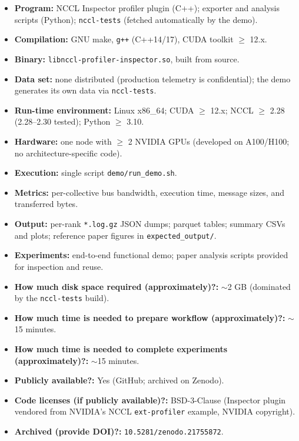 \documentclass[10pt,twocolumn]{article}
\begin{document}
{\small
\begin{itemize}
  \item {\bf Program: } NCCL Inspector profiler plugin (C++);
        exporter and analysis scripts (Python);
        \texttt{nccl-tests} (fetched automatically by the demo).
  \item {\bf Compilation: } GNU make, \texttt{g++} (C++14/17),
        CUDA toolkit $\geq$ 12.x.
  \item {\bf Binary: } \texttt{libnccl-profiler-inspector.so},
        built from source.
  \item {\bf Data set: } none distributed (production telemetry is
        confidential); the demo generates its own data via
        \texttt{nccl-tests}.
  \item {\bf Run-time environment: } Linux x86\_64; CUDA $\geq$ 12.x;
        NCCL $\geq$ 2.28 (2.28--2.30 tested); Python $\geq$ 3.10.
  \item {\bf Hardware: } one node with $\geq$ 2 NVIDIA GPUs
        (developed on A100/H100; no architecture-specific code).
  \item {\bf Execution: } single script \texttt{demo/run\_demo.sh}.
  \item {\bf Metrics: } per-collective bus bandwidth, execution
        time, message sizes, and transferred bytes.
  \item {\bf Output: } per-rank \texttt{*.log.gz} JSON dumps;
        parquet tables; summary CSVs and plots; reference paper
        figures in \texttt{expected\_output/}.
  \item {\bf Experiments: } end-to-end functional demo; paper
        analysis scripts provided for inspection and reuse.
  \item {\bf How much disk space required (approximately)?: }
        $\sim$2 GB (dominated by the \texttt{nccl-tests} build).
  \item {\bf How much time is needed to prepare workflow
        (approximately)?: } $\sim$15 minutes.
  \item {\bf How much time is needed to complete experiments
        (approximately)?: } $\sim$15 minutes.
  \item {\bf Publicly available?: } Yes (GitHub; archived on
        Zenodo).
  \item {\bf Code licenses (if publicly available)?: }
        BSD-3-Clause (Inspector plugin vendored from NVIDIA's NCCL
        \texttt{ext-profiler} example, NVIDIA copyright).
  \item {\bf Archived (provide DOI)?: }
        \texttt{10.5281/zenodo.21755872}.
\end{itemize}
}
\end{document}
